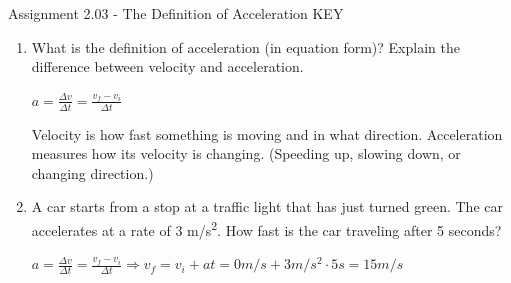 \documentclass[letterpaper, 12pt]{article}
\begin{document}


\begin{center} Assignment 2.03 - The Definition of Acceleration KEY
\end{center}





\begin{enumerate}
\item What is the definition of acceleration (in equation form)?  Explain the difference between velocity and acceleration.  

	\color{red}
	\begin{center} $ a = \frac{\Delta v}{\Delta t } = \frac{v_f - v_i}{\Delta t}$
		\vspace{0.15in}
		
			Velocity is how fast something is moving and in what direction.  Acceleration measures how its velocity is changing. (Speeding up, slowing down, or changing direction.)
		
	\end{center}
	
	
	\color{black}
	\vspace{0.15in}


\item A car starts from a stop at a traffic light that has just turned green.  The car accelerates at a rate of 3 m/s\textsuperscript{2}.  How fast is the car traveling after 5 seconds?

	
	\color{red}
	\begin{center} $ a = \frac{\Delta v}{\Delta t } = \frac{v_f - v_i}{\Delta t} \Longrightarrow v_f = v_i + a t =  0 m/s + 3 m/s^2 \cdot 5s = 15 m/s $
		\vspace{0.15in}
		
	
	\end{center}
	
	
	\color{black}








\end{enumerate}
\end{document}

